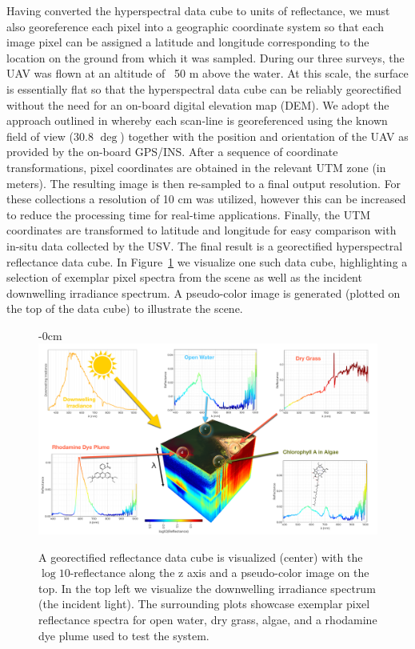 \documentclass[journal,article,submit,pdftex,moreauthors]{Definitions/mdpi}
\begin{document}
Having converted the hyperspectral data cube to units of reflectance, we must also georeference each pixel into a geographic coordinate system so that each image pixel can be assigned a latitude and longitude corresponding to the location on the ground from which it was sampled. During our three surveys, the UAV was flown at an altitude of ~50 m above the water. At this scale, the surface is essentially flat so that the hyperspectral data cube can be reliably georectified without the need for an on-board digital elevation map (DEM). We adopt the approach outlined in \cite{GeorectificationMuller, GeorectificationBaumker, GeorectificationMostafa} whereby each scan-line is georeferenced using the known field of view (30.8 $\deg$) together with the position and orientation of the UAV as provided by the on-board GPS/INS. After a sequence of coordinate transformations, pixel coordinates are obtained in the relevant UTM zone (in meters). The resulting image is then re-sampled to a final output resolution. For these collections a resolution of 10 cm was utilized, however this can be increased to reduce the processing time for real-time applications. Finally, the UTM coordinates are transformed to latitude and longitude for easy comparison with in-situ data collected by the USV. The final result is a georectified hyperspectral reflectance data cube. In Figure~\ref{fig:hsi-infographic} we visualize one such data cube, highlighting a selection of exemplar pixel spectra from the scene as well as the incident downwelling irradiance spectrum. A pseudo-color image is generated (plotted on the top of the data cube) to illustrate the scene.

\begin{figure}[H]
\begin{adjustwidth}{-\extralength}{0cm}
\centering
\includegraphics[width=15.5cm]{paper/figures/materials-and-methods/HyperSpectralInfoGraphic.pdf}
\end{adjustwidth}
\caption{A georectified reflectance data cube is visualized (center) with the $\log10$-reflectance along the z axis and a pseudo-color image on the top. In the top left we visualize the downwelling irradiance spectrum (the incident light). The surrounding plots showcase exemplar pixel reflectance spectra for open water, dry grass, algae, and a rhodamine dye plume used to test the system.\label{fig:hsi-infographic}}
\end{figure}  
\end{document}
